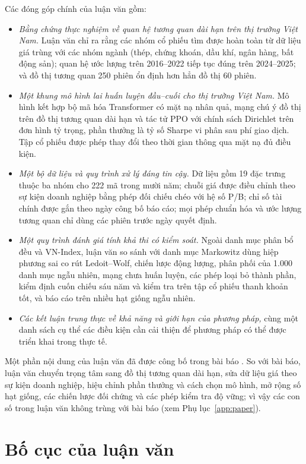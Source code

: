 Các đóng góp chính của luận văn gồm:
\begin{itemize}
  \item \textit{Bằng chứng thực nghiệm về quan hệ tương quan dài hạn trên thị trường Việt Nam.} Luận văn chỉ ra rằng các nhóm cổ phiếu tìm được hoàn toàn từ dữ liệu giá trùng với các nhóm ngành (thép, chứng khoán, dầu khí, ngân hàng, bất động sản); quan hệ ước lượng trên 2016--2022 tiếp tục đúng trên 2024--2025; và đồ thị tương quan 250 phiên ổn định hơn hẳn đồ thị 60 phiên.
  \item \textit{Một khung mô hình lai huấn luyện đầu--cuối cho thị trường Việt Nam.} Mô hình kết hợp bộ mã hóa Transformer có mặt nạ nhân quả, mạng chú ý đồ thị trên đồ thị tương quan dài hạn và tác tử PPO với chính sách Dirichlet trên đơn hình tỷ trọng, phần thưởng là tỷ số Sharpe vi phân sau phí giao dịch. Tập cổ phiếu được phép thay đổi theo thời gian thông qua mặt nạ đủ điều kiện.
  \item \textit{Một bộ dữ liệu và quy trình xử lý đáng tin cậy.} Dữ liệu gồm 19 đặc trưng thuộc ba nhóm cho 222 mã trong mười năm; chuỗi giá được điều chỉnh theo sự kiện doanh nghiệp bằng phép đối chiếu chéo với hệ số P/B; chỉ số tài chính được gắn theo ngày công bố báo cáo; mọi phép chuẩn hóa và ước lượng tương quan chỉ dùng các phiên trước ngày quyết định.
  \item \textit{Một quy trình đánh giá tính khả thi có kiểm soát.} Ngoài danh mục phân bổ đều và VN-Index, luận văn so sánh với danh mục Markowitz dùng hiệp phương sai co rút Ledoit--Wolf, chiến lược động lượng, phân phối của 1.000 danh mục ngẫu nhiên, mạng chưa huấn luyện, các phép loại bỏ thành phần, kiểm định cuốn chiếu sáu năm và kiểm tra trên tập cổ phiếu thanh khoản tốt, và báo cáo trên nhiều hạt giống ngẫu nhiên.
  \item \textit{Các kết luận trung thực về khả năng và giới hạn của phương pháp,} cùng một danh sách cụ thể các điều kiện cần cải thiện để phương pháp có thể được triển khai trong thực tế.
\end{itemize}

Một phần nội dung của luận văn đã được công bố trong bài báo \cite{tran2026dynamic}. So với bài báo, luận văn chuyển trọng tâm sang đồ thị tương quan dài hạn, sửa dữ liệu giá theo sự kiện doanh nghiệp, hiệu chỉnh phần thưởng và cách chọn mô hình, mở rộng số hạt giống, các chiến lược đối chứng và các phép kiểm tra độ vững; vì vậy các con số trong luận văn không trùng với bài báo (xem Phụ lục~\ref{app:paper}).

\section*{Bố cục của luận văn}

